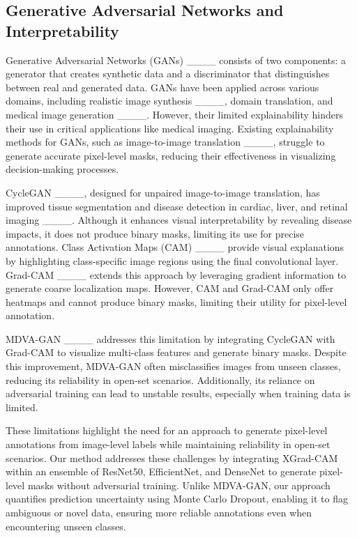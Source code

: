 \subsection{Generative Adversarial Networks and Interpretability}

Generative Adversarial Networks (GANs) ____ consists of two components: a generator that creates synthetic data and a discriminator that distinguishes between real and generated data. GANs have been applied across various domains, including realistic image synthesis ____, domain translation, and medical image generation ____. However, their limited explainability hinders their use in critical applications like medical imaging. Existing explainability methods for GANs, such as image-to-image translation ____, struggle to generate accurate pixel-level masks, reducing their effectiveness in visualizing decision-making processes.

CycleGAN ____, designed for unpaired image-to-image translation, has improved tissue segmentation and disease detection in cardiac, liver, and retinal imaging ____. Although it enhances visual interpretability by revealing disease impacts, it does not produce binary masks, limiting its use for precise annotations. Class Activation Maps (CAM) ____ provide visual explanations by highlighting class-specific image regions using the final convolutional layer. Grad-CAM ____ extends this approach by leveraging gradient information to generate coarse localization maps. However, CAM and Grad-CAM only offer heatmaps and cannot produce binary masks, limiting their utility for pixel-level annotation.

MDVA-GAN ____ addresses this limitation by integrating CycleGAN with Grad-CAM to visualize multi-class features and generate binary masks. Despite this improvement, MDVA-GAN often misclassifies images from unseen classes, reducing its reliability in open-set scenarios. Additionally, its reliance on adversarial training can lead to unstable results, especially when training data is limited.

These limitations highlight the need for an approach to generate pixel-level annotations from image-level labels while maintaining reliability in open-set scenarios. Our method addresses these challenges by integrating XGrad-CAM within an ensemble of ResNet50, EfficientNet, and DenseNet to generate pixel-level masks without adversarial training. Unlike MDVA-GAN, our approach quantifies prediction uncertainty using Monte Carlo Dropout, enabling it to flag ambiguous or novel data, ensuring more reliable annotations even when encountering unseen classes.

